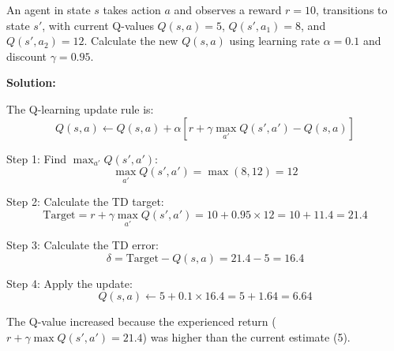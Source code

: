 \begin{examplebox}
An agent in state $s$ takes action $a$ and observes a reward $r = 10$, transitions to state $s'$, with current Q-values $Q(s,a) = 5$, $Q(s', a_1) = 8$, and $Q(s', a_2) = 12$. Calculate the new $Q(s,a)$ using learning rate $\alpha = 0.1$ and discount $\gamma = 0.95$.

\textbf{Solution:}

The Q-learning update rule is:
\begin{equation}
Q(s,a) \leftarrow Q(s,a) + \alpha \left[ r + \gamma \max_{a'} Q(s', a') - Q(s,a) \right]
\end{equation}

Step 1: Find $\max_{a'} Q(s', a')$:
\begin{equation}
\max_{a'} Q(s', a') = \max(8, 12) = 12
\end{equation}

Step 2: Calculate the TD target:
\begin{equation}
\text{Target} = r + \gamma \max_{a'} Q(s', a') = 10 + 0.95 \times 12 = 10 + 11.4 = 21.4
\end{equation}

Step 3: Calculate the TD error:
\begin{equation}
\delta = \text{Target} - Q(s,a) = 21.4 - 5 = 16.4
\end{equation}

Step 4: Apply the update:
\begin{equation}
Q(s,a) \leftarrow 5 + 0.1 \times 16.4 = 5 + 1.64 = \boxed{6.64}
\end{equation}

The Q-value increased because the experienced return ($r + \gamma \max Q(s',a') = 21.4$) was higher than the current estimate (5).
\end{examplebox}

